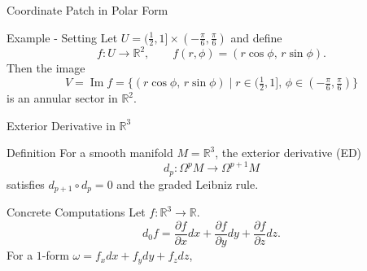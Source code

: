 
\date{29 October 2025}



\begin{frame}
  \cmctitleframe
\end{frame}


\begin{frame}{Coordinate Patch in Polar Form}
\vspace{-0.2cm}
\begin{block}{Example - Setting}
Let \(U=(\tfrac12,1]\times(-\tfrac{\pi}{6},\tfrac{\pi}{6})\) and define
\vspace{-0.2cm}
\[
f:U\to\mathbb{R}^2,\qquad f(r,\phi)=(r\cos\phi,\,r\sin\phi).
\]
Then the image
\vspace{-0.3cm}
\[
V=\operatorname{Im}f=\{(r\cos\phi,\,r\sin\phi)\mid r\in(\tfrac12,1],\,\phi\in(-\tfrac{\pi}{6},\tfrac{\pi}{6})\}
\]
is an annular sector in \(\mathbb{R}^2\).
\end{block}
\vspace{-0.5cm}
\begin{center}
\end{center}
\end{frame}


\begin{frame}{Exterior Derivative in \(\mathbb{R}^3\)}
\begin{block}{Definition}
For a smooth manifold \(M=\mathbb{R}^3\), the exterior derivative (ED)
\[
d_p:\Omega^pM\to\Omega^{p+1}M
\]
satisfies \(d_{p+1}\circ d_p=0\) and the graded Leibniz rule.
\end{block}

\begin{block}{Concrete Computations}
Let \(f:\mathbb{R}^3\to\mathbb{R}\).
\[
d_0f=\frac{\partial f}{\partial x}dx+\frac{\partial f}{\partial y}dy+\frac{\partial f}{\partial z}dz.
\]
For a \(1\)-form \(\omega=f_xdx+f_ydy+f_zdz\),
\end{block}
\end{frame}

